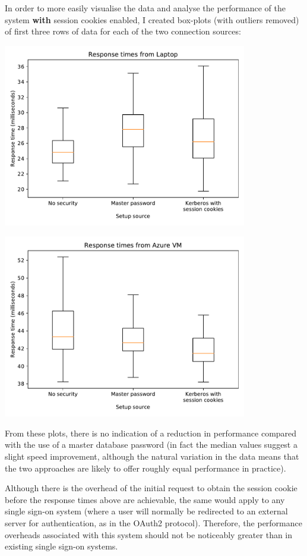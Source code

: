 \documentclass[12pt]{report}
\begin{document}
In order to more easily visualise the data and analyse the performance of the system \textbf{with} session cookies enabled, I created box-plots (with outliers removed) of first three rows of data for each of the two connection sources:

\begin{center}
  \includegraphics[width=0.8\textwidth]{11-response-times-laptop.pdf}
\end{center}

\begin{center}
  \includegraphics[width=0.8\textwidth]{12-response-times-azure.pdf}
\end{center}

From these plots, there is no indication of a reduction in performance compared with the use of a master database password (in fact the median values suggest a slight speed improvement, although the natural variation in the data means that the two approaches are likely to offer roughly equal performance in practice).

Although there is the overhead of the initial request to obtain the session cookie before the response times above are achievable, the same would apply to any single sign-on system (where a user will normally be redirected to an external server for authentication, as in the OAuth2 protocol). Therefore, the performance overheads associated with this system should not be noticeably greater than in existing single sign-on systems.
\end{document}
